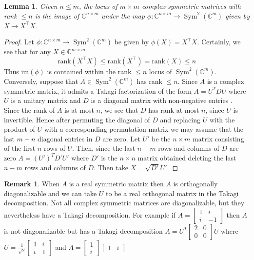 \documentclass{article}
\newtheorem{Lemma}{Lemma}
\theoremstyle{definition}
\newtheorem{Remark}{Remark}
\renewcommand{\|}{|}
\renewcommand{\i}{\mathscr{I}}
\newcommand{\im}{\mathrm{im}}
\renewcommand{\c}{\mathbb{C}}
\newcommand{\rank}[1]{\mathrm{rank}\left(#1\right)}
\renewcommand{\i}{\mathcal{I}}
\begin{document}
\begin{Lemma}\label{lem:takagi}
    Given $n\leq m$, the locus of $m \times m$ complex symmetric matrices with rank $\leq n$ is the image of $\c^{n\times m}$ under the map $\phi: \c^{n\times m} \to \operatorname{Sym}^2(\c^m)$ given by $X \mapsto X^\top X$. 
\end{Lemma}
\begin{proof}
    Let $\phi: \c^{n\times m} \to \operatorname{Sym}^2(\c^m)$ be given by $\phi(X) = X^\top X$. Certainly, we see that for any $X \in \c^{m\times m}$
    $$\rank{X^\top X} \leq \rank{X^\top } = \rank{X} \leq n$$
    Thus $\im(\phi)$ is contained within the rank $\leq n$ locus of $\operatorname{Sym}^2(\c^m)$. Conversely, suppose that $A \in \operatorname{Sym}^2(\c^m)$ has rank $\leq n$. Since $A$ is a complex symmetric matrix, it admits a Takagi factorization of the form $A=U^TDU$ where $U$ is a unitary matrix and $D$ is a diagonal matrix with non-negative entries \cite{Takagi1924Algebraic}. 
    Since the rank of $A$ is at-most $n$, we see that
    $D$ has rank at most $n$, since $U$ is invertible. Hence after permuting the diagonal of $D$ 
    and replacing $U$ with the product of $U$ with a corresponding permutation matrix we may assume
    that the last $m-n$ diagonal entries in $D$ are zero. Let
    $U'$ be the $n \times m$ matrix consisting of the first $n$ rows of $U$. Then, since the last $n-m$ rows
    and columns of $D$ are zero 
    $A = (U')^T D' U'$ where $D'$ is the $n \times n$ matrix obtained deleting the last $n-m$ rows and columns of $D$. 
    Then take $X = \sqrt{D'} U'$. 
\end{proof}


\begin{Remark}
When $A$ is a real symmetric matrix then $A$ is orthogonally diagonalizable and we can take $U$ to be a real orthogonal matrix in the Takagi decomposition. Not all complex symmetric matrices are diagonalizable, but they nevertheless have a Takagi decomposition. For example if $A = \begin{bmatrix}1 & i \\i & -1\end{bmatrix}$ then $A$ is not diagonalizable
but has a Takagi decomposition $A = U^T \begin{bmatrix}2 & 0\\0 & 0\end{bmatrix} U$ where
$U = \frac{1}{\sqrt{2}} \begin{bmatrix}1 & i\\ i & 1\end{bmatrix}$ and $A = \begin{bmatrix} 1\\i\end{bmatrix} \begin{bmatrix} 1 & i \end{bmatrix}$
\end{Remark}
\end{document}
